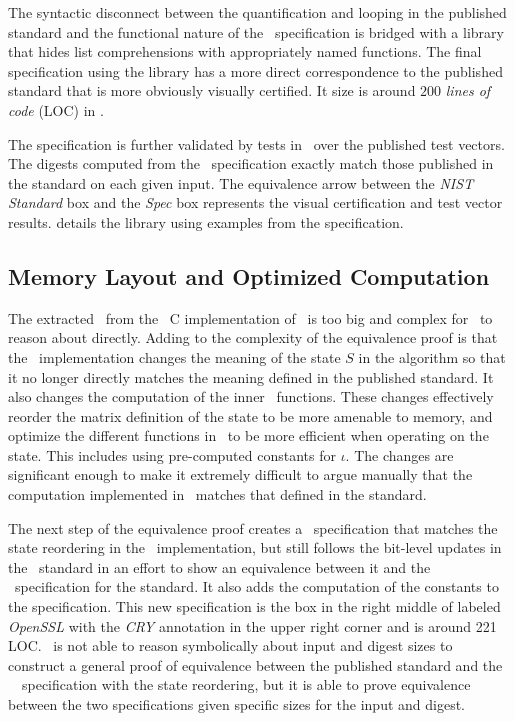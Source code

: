 The syntactic disconnect between the quantification and looping in the published standard and the functional nature of the \cryptol\ specification is bridged with a library that hides list comprehensions with appropriately named functions.
The final specification using the library has a more direct correspondence to the published standard that is more obviously visually certified.
It size is around $200$ \emph{lines of code} (LOC) in \cryptol.

The specification is further validated by tests in \cryptol\ over the published test vectors.
The digests computed from the \cryptol\ specification exactly match those published in the standard on each given input.
The equivalence arrow between the \emph{NIST Standard} box and the \emph{Spec} box represents the visual certification and test vector results.
 details the library using examples from the specification.

\subsection{Memory Layout and Optimized Computation}

The extracted \sawcore\ from the \openssl\ C implementation of \shaThree\ is too big and complex for \saw\ to reason about directly.
Adding to the complexity of the equivalence proof is that the \openssl\ implementation changes the meaning of the state $S$ in the algorithm so that it no longer directly matches the meaning defined in the published standard.
It also changes the computation of the inner \keccak\ functions.
These changes effectively reorder the matrix definition of the state to be more amenable to memory, and optimize the different functions in \keccak\ to be more efficient when operating on the state.
This includes using pre-computed constants for $\iota$.
The changes are significant enough to make it extremely difficult to argue manually that the computation implemented in \openssl\ matches that defined in the standard.

The next step of the equivalence proof creates a \cryptol\ specification that matches the state reordering in the \openssl\ implementation, but still follows the bit-level updates in the \fips\ standard in an effort to show an equivalence between it and the \cryptol\ specification for the standard.
It also adds the computation of the constants to the specification.
This new specification is the box in the right middle of  labeled \emph{OpenSSL} with the \emph{CRY} annotation in the upper right corner and is around 221 LOC. \saw\ is not able to reason symbolically about input and digest sizes to construct a general proof of equivalence between the published standard and the \openssl\ \cryptol\ specification with the state reordering, but it is able to prove equivalence between the two specifications given specific sizes for the input and digest.

